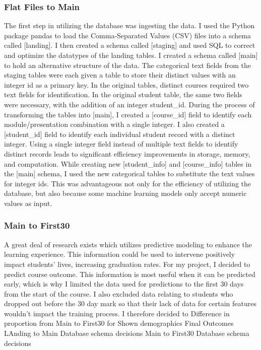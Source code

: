 \documentclass{article}
\begin{document}
            \subsubsection{Flat Files to Main}
                The first step in utilizing the database was ingesting the data.
                I used the Python package pandas to load the Comma-Separated Values (CSV) files into a schema called [landing].
                I then created a schema called [staging] and used SQL to correct and optimize the datatypes of the landing tables.       
                I created a schema called [main] to hold an alternative structure of the data.
                \newline
                The categorical text fields from the staging tables were each given a table to store their distinct values with an integer id as a primary key.
                In the original tables, distinct courses required two text fields for identification.
                In the original student table, the same two fields were necessary, with the addition of an integer student\_id. 
                During the process of transforming the tables into [main], I created a [course\_id] field to identify each module/presentation combination with a single integer.
                I also created a [student\_id] field to identify each individual student record with a distinct integer. 
                Using a single integer field instead of multiple text fields to identify distinct records leads to significant efficiency improvements in storage, memory, and computation.
                While creating new [student\_info] and [course\_info] tables in the [main] schema, I used the new categorical tables to substitute the text values for integer ids.
                This was advantageous not only for the efficiency of utilizing the database, but also because some machine learning models only accept numeric values as input.

            \subsubsection{Main to First30}
                A great deal of research exists which utilizes predictive modeling to enhance the learning experience.
                This information could be used to intervene positively impact students' lives, increasing graduation rates.
                For my project, I decided to predict course outcome.
                This information is most useful when it can be predicted early, which is why I limited the data used for predictions to the first 30 days from the start of the course.
                I also excluded data relating to students who dropped out before the 30 day mark so that their lack of data for certain features wouldn't impact the training process.
                \newline
                I therefore decided to 
                Difference in proportion from Main to First30 for 
                Shown demographics
                Final Outcomes
                LAnding to Main Database schema decisions
                Main to First30 Database schema decisions
\end{document}
